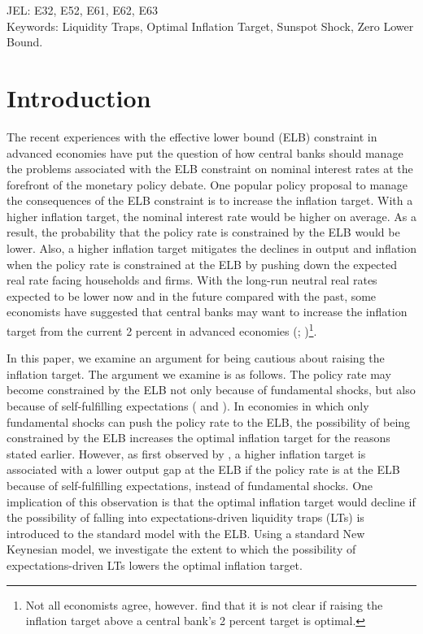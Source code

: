 \documentclass[11pt]{article}
\begin{document}
	\vspace{5em}

	\noindent JEL: E32, E52, E61, E62, E63\\

	\noindent Keywords: Liquidity Traps, Optimal Inflation Target, Sunspot Shock, Zero Lower Bound.

	\newpage

	\section{Introduction}
	\label{S:Introduction}

	The recent experiences with the effective lower bound (ELB) constraint in advanced economies have put the question of how central banks should manage the problems associated with the ELB constraint on nominal interest rates at the forefront of the monetary policy debate. One popular policy proposal to manage the consequences of the ELB constraint is to increase the inflation target. With a higher inflation target, the nominal interest rate would be higher on average. As a result, the probability that the policy rate is constrained by the ELB would be lower. Also, a higher inflation target mitigates the declines in output and inflation when the policy rate is constrained at the ELB by pushing down the expected real rate facing households and firms. With the long-run neutral real rates expected to be lower now and in the future compared with the past, some economists have suggested that central banks may want to increase the inflation target from the current 2 percent in advanced economies (\citet{Ball2013}; \citet{BlanchardDellAricciaMauro2010})\footnote{Not all economists agree, however. \citet{CoibionGorodnichenkoWieland2012} find that it is not clear if raising the inflation target above a central bank's 2 percent target is optimal.}.

	In this paper, we examine an argument for being cautious about raising the inflation target. The argument we examine is as follows. The policy rate may become constrained by the ELB not only because of fundamental shocks, but also because of self-fulfilling expectations (\citet{BenhabibSchmittGroheUribe2001} and \citet{Bullard2010}). In economies in which only fundamental shocks can push the policy rate to the ELB, the possibility of being constrained by the ELB increases the optimal inflation target for the reasons stated earlier. However, as first observed by \citet{MertensRavn2014}, a higher inflation target is associated with a lower output gap at the ELB if the policy rate is at the ELB because of self-fulfilling expectations, instead of fundamental shocks. One implication of this observation is that the optimal inflation target would decline if the possibility of falling into expectations-driven liquidity traps (LTs) is introduced to the standard model with the ELB. Using a standard New Keynesian model, we investigate the extent to which the possibility of expectations-driven LTs lowers the optimal inflation target.
\end{document}
